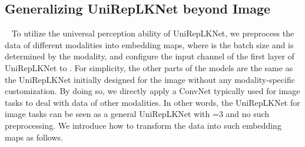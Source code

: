 \documentclass[10pt,twocolumn,letterpaper]{article}
\begin{document}
	\begin{table}
		\caption{Architectural hyper-parameters of UniRepLKNet instances, including the number of blocks in the four stages  and channels  of the first stage. Stage 1 uses SmaK Blocks, and Stages 2 and 4 use LarK Blocks only. For Stage 3, \eg, ``9 + 18'' means 9 LarK Blocks and 18 SmaK Blocks.}
		\label{table-instances}
		\vspace{-0.2in}
		\begin{center}
		\end{center}
		\vspace{-0.3in}
	\end{table}




\subsection{Generalizing UniRepLKNet beyond Image}~\label{sec:mm-design}
To utilize the universal perception ability of UniRepLKNet, we preprocess the data of different modalities into  embedding maps, where  is the batch size and  is determined by the modality, and configure the input channel of the first layer of UniRepLKNet to . For simplicity, the other parts of the models are the same as the UniRepLKNet initially designed for the image without any modality-specific customization. By doing so, we directly apply a ConvNet typically used for image tasks to deal with data of other modalities. In other words, the UniRepLKNet for image tasks can be seen as a general UniRepLKNet with =3 and no such preprocessing. We introduce how to transform the data into such embedding maps as follows.
\end{document}
